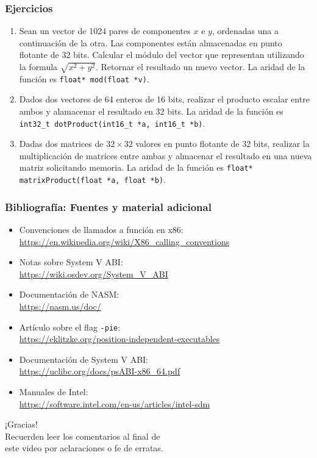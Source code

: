 \documentclass[aspectratio=169]{beamer}
\begin{document}
\begin{frame}[fragile]
	\frametitle{Ejercicios}
	\begin{enumerate}
	 \item Sean un vector de 1024 pares de componentes $x$ e $y$, ordenadas una a continuación de la otra. Las componentes están almacenadas en punto flotante de 32 bits. Calcular el módulo del vector que representan utilizando la formula $\sqrt{x^2+y^2}$. Retornar el resultado un nuevo vector. La aridad de la función es \verb|float* mod(float *v)|.
	 \vskip 10pt
	 \item Dados dos vectores de 64 enteros de 16 bits, realizar el producto escalar entre ambos y alamacenar el resultado en 32 bits. La aridad de la función es \verb|int32_t dotProduct(int16_t *a, int16_t *b)|.
	 \vskip 10pt
	 \item Dadas dos matrices de $32 \times 32$ valores en punto flotante de 32 bits, realizar la multiplicación de matrices entre ambas y almacenar el resultado en una nueva matriz solicitando memoria. La aridad de la función es \verb|float* matrixProduct(float *a, float *b)|.
	\end{enumerate}
\end{frame}

\begin{frame}[fragile]
    \frametitle{Bibliografía: Fuentes y material adicional}
    \begin{itemize}
    \item Convenciones de llamados a función en x86: \\
    \url{https://en.wikipedia.org/wiki/X86_calling_conventions}
    \item Notas sobre System V ABI: \\
    \url{https://wiki.osdev.org/System_V_ABI}
    \item Documentación de NASM: \\
    \url{https://nasm.us/doc/}
    \item Artículo sobre el flag \texttt{-pie}: \\
    \url{https://eklitzke.org/position-independent-executables}
    \item Documentación de System V ABI: \\
    \url{https://uclibc.org/docs/psABI-x86_64.pdf}
    \item Manuales de Intel: \\
    \url{https://software.intel.com/en-us/articles/intel-sdm}
    \end{itemize}
\end{frame}

\begin{frame}[plain]
\begin{center}
\vspace{2cm}
\huge ¡Gracias!\\
\vspace{2cm}
\normalsize Recuerden leer los comentarios al final de \\ este video por aclaraciones o fe de erratas.
\end{center}
\end{frame}
\end{document}
